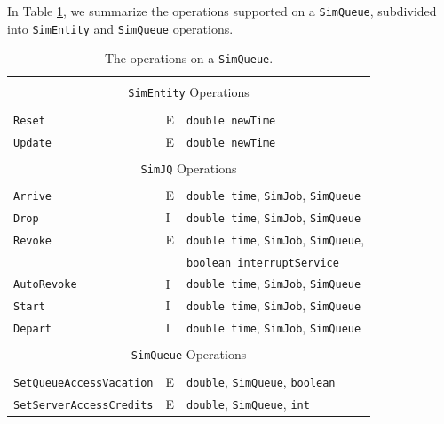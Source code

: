 In Table \ref{tab:guided:operations},
  we summarize the operations supported on a \lstinline|SimQueue|,
  subdivided into \lstinline|SimEntity|
  and \lstinline|SimQueue| operations.

\begin{table}[!htbp]
	\label{tab:guided:operations}
	\caption{The operations on a \texttt{SimQueue}.}
	\begin{center}
		\begin{tabular}{|l|l|l|}
			\hline
			\multicolumn{3}{|c|}{} \\
			\multicolumn{3}{|c|}{\texttt{SimEntity} Operations} \\
			\multicolumn{3}{|c|}{} \\
			\hline
			\lstinline|Reset|   & E & \lstinline|double newTime| \\ \hline
			\lstinline|Update|  & E & \lstinline|double newTime| \\ \hline
			\hline
			\multicolumn{3}{|c|}{} \\
			\multicolumn{3}{|c|}{\texttt{SimJQ} Operations} \\
			\multicolumn{3}{|c|}{} \\
			\hline
			\lstinline|Arrive|            & E & \lstinline|double time|, \lstinline|SimJob|, \lstinline|SimQueue| \\ \hline
			\lstinline|Drop|              & I & \lstinline|double time|, \lstinline|SimJob|, \lstinline|SimQueue| \\ \hline
			\lstinline|Revoke|            & E & \lstinline|double time|, \lstinline|SimJob|, \lstinline|SimQueue|,\\
			&   & \lstinline|boolean interruptService|                              \\ \hline
			\lstinline|AutoRevoke|        & I & \lstinline|double time|, \lstinline|SimJob|, \lstinline|SimQueue| \\ \hline
			\lstinline|Start|             & I & \lstinline|double time|, \lstinline|SimJob|, \lstinline|SimQueue| \\ \hline
			\lstinline|Depart|            & I & \lstinline|double time|, \lstinline|SimJob|, \lstinline|SimQueue| \\ \hline
			\hline
			\multicolumn{3}{|c|}{} \\
			\multicolumn{3}{|c|}{\texttt{SimQueue} Operations} \\
			\multicolumn{3}{|c|}{} \\
			\hline
			\lstinline|SetQueueAccessVacation| & E & \lstinline|double|, \lstinline|SimQueue|, \lstinline|boolean| \\ \hline
			\lstinline|SetServerAccessCredits| & E & \lstinline|double|, \lstinline|SimQueue|, \lstinline|int|     \\ \hline
		\end{tabular}
	\end{center}
\end{table}

